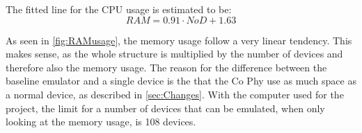 The fitted line for the CPU usage is estimated to be:
\begin{equation}
RAM = 0.91 \cdot NoD + 1.63
\end{equation}


As seen in \autoref{fig:RAMusage}, the memory usage follow a very linear tendency. This makes sense, as the whole structure is multiplied by the number of devices and therefore also the memory usage. The reason for the difference between the baseline emulator and a single device is the that the Co Phy use as much space as a normal device, as described in \autoref{sec:Changes}. With the computer used for the project, the limit for a number of devices that can be emulated, when only looking at the memory usage, is 108 devices.



